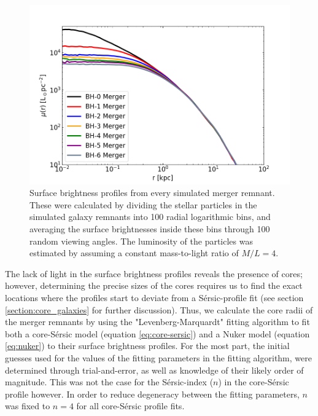\documentclass[english, twoside]{HYgradu}
\begin{document}
\begin{figure}
	\centering
	\includegraphics[width=\textwidth]{SurfaceBrightnessProfiles.png}
	\caption{Surface brightness profiles from every simulated merger remnant. These were calculated by dividing the stellar particles in the simulated galaxy remnants into 100 radial logarithmic bins, and averaging the surface brightnesses inside these bins through 100 random viewing angles. The luminosity of the particles was estimated by assuming a constant mass-to-light ratio of $M/L = 4$.}
	\label{figure:surface_brightness}
\end{figure}

The lack of light in the surface brightness profiles reveals the presence of cores; however, determining the precise sizes of the cores requires us to find the exact locations where the profiles start to deviate from a Sérsic-profile fit (see section \ref{section:core_galaxies} for further discussion). Thus, we calculate the core radii of the merger remnants by using the "Levenberg-Marquardt" fitting algorithm to fit both a core-Sérsic model (equation \ref{eq:core-sersic}) and a Nuker model (equation \ref{eq:nuker}) to their surface brightness profiles. For the most part, the initial guesses used for the values of the fitting parameters in the fitting algorithm, were determined through trial-and-error, as well as knowledge of their likely order of magnitude. This was not the case for the Sérsic-index ($n$) in the core-Sérsic profile however. In order to reduce degeneracy between the fitting parameters, $n$ was fixed to $n=4$ for all core-Sérsic profile fits.
\end{document}
